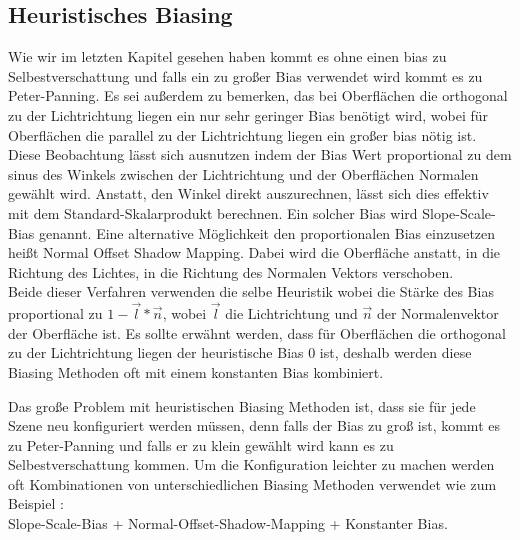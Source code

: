 \subsection{Heuristisches Biasing}
\label{section:heuristic-biasing}
Wie wir im letzten Kapitel gesehen haben kommt es ohne einen bias zu Selbestverschattung
und falls ein zu großer Bias verwendet wird kommt es zu Peter-Panning.
Es sei außerdem zu bemerken, das bei Oberflächen die orthogonal zu der Lichtrichtung liegen 
ein nur sehr geringer Bias benötigt wird, wobei für Oberflächen die parallel zu der Lichtrichtung 
liegen ein großer bias nötig ist.
Diese Beobachtung lässt sich ausnutzen indem der Bias Wert proportional zu dem sinus des Winkels zwischen
der Lichtrichtung und der Oberflächen Normalen gewählt wird.
Anstatt, den Winkel direkt auszurechnen, lässt sich dies effektiv mit dem Standard-Skalarprodukt berechnen.
Ein solcher Bias wird Slope-Scale-Bias genannt.
Eine alternative Möglichkeit den proportionalen Bias einzusetzen heißt Normal Offset Shadow Mapping.
Dabei wird die Oberfläche anstatt, in die Richtung des Lichtes, in die Richtung des Normalen Vektors 
verschoben.
\\
Beide dieser Verfahren verwenden die selbe Heuristik wobei die Stärke des Bias 
proportional zu $1 - \overrightarrow{l} * \overrightarrow{n}$, wobei $\overrightarrow{l}$ 
die Lichtrichtung und $\overrightarrow{n}$ der Normalenvektor der Oberfläche ist.
Es sollte erwähnt werden, dass für Oberflächen die orthogonal zu der Lichtrichtung liegen
der heuristische Bias 0 ist,
deshalb werden diese Biasing Methoden oft mit einem konstanten Bias kombiniert.
\par
Das große Problem mit heuristischen Biasing Methoden ist, dass 
sie für jede Szene neu konfiguriert werden müssen,
denn falls der Bias zu groß ist, kommt es zu Peter-Panning und falls er zu klein gewählt 
wird kann es zu Selbestverschattung kommen.
Um die Konfiguration leichter zu machen werden oft Kombinationen 
von unterschiedlichen Biasing Methoden verwendet wie zum Beispiel : \\
Slope-Scale-Bias + Normal-Offset-Shadow-Mapping + Konstanter Bias.

